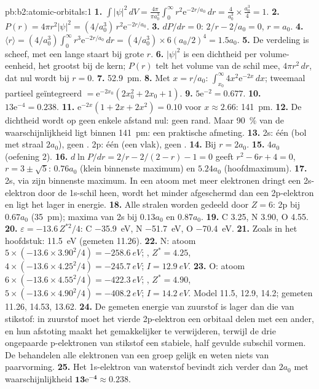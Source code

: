 \begin{solution}{pb:b2:atomic-orbitals:1}
\textbf{1.} $\int|\psi|^2\,dV = \frac{4\pi}{\pi a_0^3}\int_0^\infty r^2\mathrm e^{-2r/a_0}\,dr =
\frac{4}{a_0^3} \times \frac{a_0^3}{4} = 1$.
\textbf{2.} $P(r) = 4\pi r^2|\psi|^2 = (4/a_0^3)\,r^2\mathrm e^{-2r/a_0}$.
\textbf{3.} $dP/dr = 0$: $2/r - 2/a_0 = 0$, $r = a_0$.
\textbf{4.} $\langle r\rangle = (4/a_0^3)\int_0^\infty r^3\mathrm e^{-2r/a_0}\,dr = (4/a_0^3)
\times 6(a_0/2)^4 = 1.5a_0$.
\textbf{5.} De verdeling is scheef, met een lange staart bij grote $r$.
\textbf{6.} $|\psi|^2$ is een dichtheid per volume-eenheid, het grootst bij de kern; $P(r)$
telt het volume van de schil mee, $4\pi r^2\,dr$, dat nul wordt bij $r = 0$.
\textbf{7.} \qty{52.9}{pm}.
\textbf{8.} Met $x = r/a_0$: $\int_{x_0}^\infty 4x^2\mathrm e^{-2x}\,dx$; tweemaal partieel geïntegreerd
$= \mathrm e^{-2x_0}(2x_0^2 + 2x_0 + 1)$.
\textbf{9.} $5\mathrm e^{-2} = 0.677$.
\textbf{10.} $13\mathrm e^{-4} = 0.238$.
\textbf{11.} $\mathrm e^{-2x}(1 + 2x + 2x^2) = 0.10$ voor $x \approx 2.66$: \qty{141}{pm}.
\textbf{12.} De dichtheid wordt op geen enkele afstand nul: geen rand. Maar 90~\% van de
waarschijnlijkheid ligt binnen \qty{141}{pm}: een praktische afmeting.
\textbf{13.} 2s: één  (bol met straal $2a_0$), geen . 2p: één
 (een vlak), geen .
\textbf{14.} Bij $r = 2a_0$.
\textbf{15.} $4a_0$ (oefening 2).
\textbf{16.} $d\ln P/dr = 2/r - 2/(2 - r) - 1 = 0$ geeft $r^2 - 6r + 4 = 0$, $r = 3 \pm \sqrt5$:
$0.76a_0$ (klein binnenste maximum) en $5.24a_0$ (hoofdmaximum).
\textbf{17.} 2s, via zijn binnenste maximum. In een atoom met meer elektronen dringt een 2s-elektron
door de 1s-schil heen, wordt het minder afgeschermd dan een 2p-elektron en ligt het lager in
energie.
\textbf{18.} Alle stralen worden gedeeld door $Z = 6$: 2p bij $0.67a_0$ (\qty{35}{pm}); maxima van 2s
bij $0.13a_0$ en $0.87a_0$.
\textbf{19.} C 3.25, N 3.90, O 4.55.
\textbf{20.} $\varepsilon = -13.6\,Z^{*2}/4$: C \qty{-35.9}{eV}, N \qty{-51.7}{eV}, O
\qty{-70.4}{eV}.
\textbf{21.} Zoals in het hoofdstuk: \qty{11.5}{eV} (gemeten 11.26).
\textbf{22.} N: atoom $5 \times (-13.6 \times 3.90^2/4) = \qty{-258.6}{eV}$; , $Z^* =
4.25$, $4 \times (-13.6 \times 4.25^2/4) = \qty{-245.7}{eV}$; $I = \qty{12.9}{eV}$.
\textbf{23.} O: atoom $6 \times (-13.6 \times 4.55^2/4) = \qty{-422.3}{eV}$; , $Z^* =
4.90$, $5 \times (-13.6 \times 4.90^2/4) = \qty{-408.2}{eV}$; $I = \qty{14.2}{eV}$. Model
11.5, 12.9, 14.2; gemeten 11.26, 14.53, 13.62.
\textbf{24.} De gemeten energie van zuurstof is lager dan die van stikstof: in
zuurstof moet het vierde 2p-elektron een orbitaal delen met een ander, en hun
afstoting maakt het gemakkelijker te verwijderen, terwijl de drie ongepaarde p-elektronen van stikstof
een stabiele, half gevulde subschil vormen. De  behandelen alle elektronen van een groep
gelijk en weten niets van paarvorming.
\textbf{25.} Het 1s-elektron van waterstof bevindt zich verder dan $2a_0$ met waarschijnlijkheid
$\boldsymbol{13\mathrm e^{-4} \approx 0.238}$.
\end{solution}
